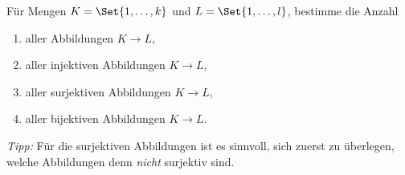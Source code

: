 \begin{prob}
  Für Mengen $K = \Set{1, \dots, k}$ und $L = \Set{1, \dots, l}$, bestimme die
  Anzahl
  \begin{enumerate}[label=(\alph*)]
  \item aller Abbildungen $K \to L$,
  \item aller injektiven Abbildungen $K \to L$,
  \item aller surjektiven Abbildungen $K \to L$,
  \item aller bijektiven Abbildungen $K \to L$.
  \end{enumerate}
  \textit{Tipp:} Für die surjektiven Abbildungen ist es sinnvoll, sich zuerst zu
  überlegen, welche Abbildungen denn \textit{nicht} surjektiv sind.
\end{prob}
